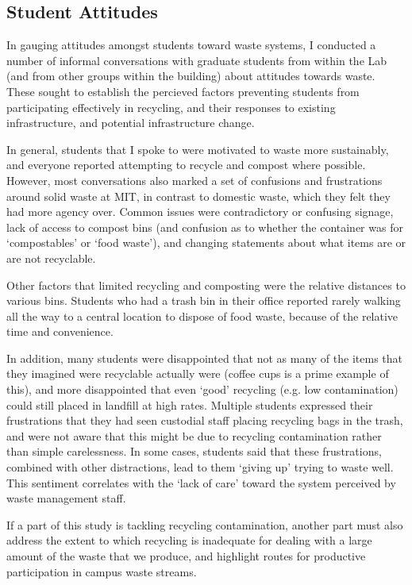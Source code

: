\documentclass[nofonts,nols,justified,nobib]{tufte-book}
\begin{document}
\subsection*{Student Attitudes}

In gauging attitudes amongst students toward waste systems, I conducted a number of informal conversations with graduate students from within the Lab (and from other groups within the building) about attitudes towards waste. These sought to establish the percieved factors preventing students from participating effectively in recycling, and their responses to existing infrastructure, and potential infrastructure change.

In general, students that I spoke to were motivated to waste more sustainably, and everyone reported attempting to recycle and compost where possible. However, most conversations also marked a set of confusions and frustrations around solid waste at MIT, in contrast to domestic waste, which they felt they had more agency over. Common issues were contradictory or confusing signage, lack of access to compost bins (and confusion as to whether the container was for `compostables' or `food waste'), and changing statements about what items are or are not recyclable.

Other factors that limited recycling and composting were the relative distances to various bins. Students who had a trash bin in their office reported rarely walking all the way to a central location to dispose of food waste, because of the relative time and convenience.

In addition, many students were disappointed that not as many of the items that they imagined were recyclable actually were (coffee cups is a prime example of this), and more disappointed that even `good' recycling (e.g. low contamination) could still placed in landfill at high rates. Multiple students expressed their frustrations that they had seen custodial staff placing recycling bags in the trash, and were not aware that this might be due to recycling contamination rather than simple carelessness. In some cases, students said that these frustrations, combined with other distractions, lead to them `giving up' trying to waste well. This sentiment correlates with the `lack of care' toward the system perceived by waste management staff.

If a part of this study is tackling recycling contamination, another part must also address the extent to which recycling is inadequate for dealing with a large amount of the waste that we produce, and highlight routes for productive participation in campus waste streams.
\end{document}
